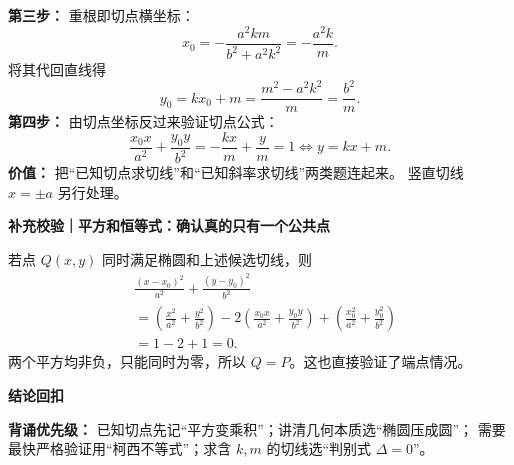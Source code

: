 \begin{proofbox}
\textbf{第三步：} 重根即切点横坐标：
\[
 x_0=-\frac{a^2km}{b^2+a^2k^2}
 =-\frac{a^2k}{m}.
\]
将其代回直线得
\[
 y_0=kx_0+m=\frac{m^2-a^2k^2}{m}=\frac{b^2}{m}.
\]
\textbf{第四步：} 由切点坐标反过来验证切点公式：
\[
 \frac{x_0x}{a^2}+\frac{y_0y}{b^2}
 =-\frac{kx}{m}+\frac{y}{m}=1
 \iff y=kx+m.
\]
\textbf{价值：} 把“已知切点求切线”和“已知斜率求切线”两类题连起来。
竖直切线 $x=\pm a$ 另行处理。

\medskip
\textbf{\textcolor{CProof}{补充校验｜平方和恒等式：确认真的只有一个公共点}}

若点 $Q(x,y)$ 同时满足椭圆和上述候选切线，则
\[
\begin{aligned}
&\frac{(x-x_0)^2}{a^2}+\frac{(y-y_0)^2}{b^2}\\
&=\left(\frac{x^2}{a^2}+\frac{y^2}{b^2}\right)
 -2\left(\frac{x_0x}{a^2}+\frac{y_0y}{b^2}\right)
 +\left(\frac{x_0^2}{a^2}+\frac{y_0^2}{b^2}\right)\\
&=1-2+1=0.
\end{aligned}
\]
两个平方均非负，只能同时为零，所以 $Q=P$。这也直接验证了端点情况。

\medskip
\textbf{\textcolor{CProof}{结论回扣}}

\textbf{背诵优先级：} 已知切点先记“平方变乘积”；讲清几何本质选“椭圆压成圆”；
需要最快严格验证用“柯西不等式”；求含 $k,m$ 的切线选“判别式 $\Delta=0$”。
\end{proofbox}
